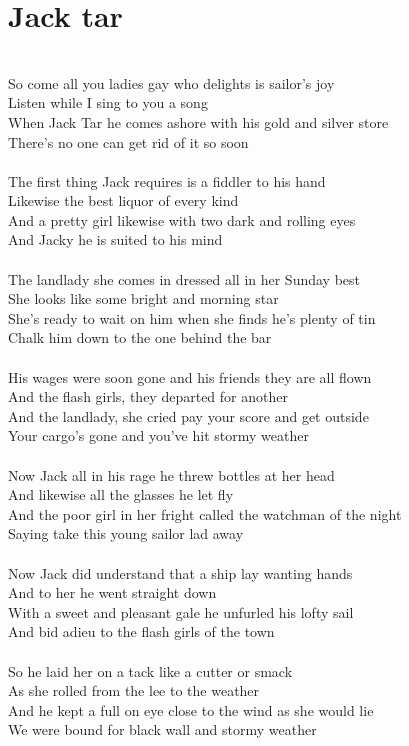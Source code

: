 \documentclass[letterpaper,14pt]{extarticle}
\begin{document}
\section{Jack tar}
\noindent
\\So come all you ladies gay who delights is sailor’s joy
\\Listen while I sing to you a song
\\When Jack Tar he comes ashore with his gold and silver store
\\There’s no one can get rid of it so soon
\\
\\The first thing Jack requires is a fiddler to his hand
\\Likewise the best liquor of every kind
\\And a pretty girl likewise with two dark and rolling eyes
\\And Jacky he is suited to his mind
\\
\\The landlady she comes in dressed all in her Sunday best
\\She looks like some bright and morning star
\\She’s ready to wait on him when she finds he’s plenty of tin
\\Chalk him down to the one behind the bar
\\
\\His wages were soon gone and his friends they are all flown
\\And the flash girls, they departed for another
\\And the landlady, she cried pay your score and get outside
\\Your cargo’s gone and you’ve hit stormy weather
\\
\\Now Jack all in his rage he threw bottles at her head
\\And likewise all the glasses he let fly
\\And the poor girl in her fright called the watchman of the night
\\Saying take this young sailor lad away
\\
\\Now Jack did understand that a ship lay wanting hands
\\And to her he went straight down
\\With a sweet and pleasant gale he unfurled his lofty sail
\\And bid adieu to the flash girls of the town
\\
\\So he laid her on a tack like a cutter or smack
\\As she rolled from the lee to the weather
\\And he kept a full on eye close to the wind as she would lie
\\We were bound for black wall and stormy weather
\end{document}
